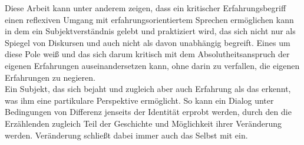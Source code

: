Diese Arbeit kann unter anderem zeigen, dass ein kritischer Erfahrungsbegriff
einen reflexiven Umgang mit erfahrungsorientiertem Sprechen ermöglichen kann in
dem ein Subjektverständnis gelebt und praktiziert wird, das sich nicht nur als
Spiegel von Diskursen und auch nicht als davon unabhängig begreift. Eines um
diese Pole weiß und das sich darum kritisch mit dem Absolutheitsanspruch der
eigenen Erfahrungen auseinandersetzen kann, ohne darin zu verfallen, die eigenen
Erfahrungen zu negieren.
\\

Ein Subjekt, das sich bejaht und zugleich aber auch Erfahrung als das erkennt,
was ihm eine partikulare Perspektive ermöglicht. So kann ein Dialog unter
Bedingungen von Differenz jenseits der Identität erprobt werden, durch den die
Erzählenden zugleich Teil der Geschichte und Möglichkeit ihrer Veränderung
werden. Veränderung schließt dabei immer auch das Selbst mit ein.
